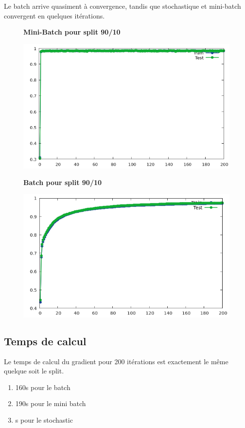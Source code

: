 \documentclass[a4paper]{article}
\begin{document}
Le batch arrive quasiment à convergence, tandis que stochastique et mini-batch convergent en quelques itérations.


\begin{figure}
  \centering
  \textbf{Mini-Batch pour split 90/10}\par\medskip
  \includegraphics[scale=0.55]{splitMiniBatch90.png}
\end{figure}


\begin{figure}
  \centering
  \textbf{Batch pour split 90/10}\par\medskip
  \includegraphics[scale=0.55]{splitBatch90.png}
\end{figure}


\subsection{Temps de calcul}

Le temps de calcul du gradient pour 200 itérations est exactement le même quelque soit le split.
\begin{enumerate}
\item 160s pour le batch
\item 190s pour le mini batch
\item s pour le stochastic
\end{enumerate}
\end{document}
